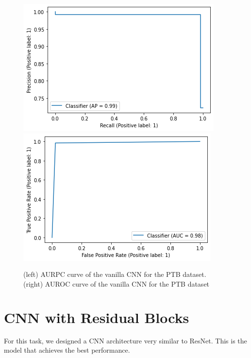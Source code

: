 \documentclass[11pt]{scrartcl}
\begin{document}
\begin{figure}[htp]
\centering
\includegraphics[width=.50\textwidth]{../models_performance_graphs/ptb/cnn_ptb_auprc.png}\hfill
\includegraphics[width=.50\textwidth]{../models_performance_graphs/ptb/cnn_ptb_auroc.png}\hfill
\caption{(left) AURPC curve of the vanilla CNN for the PTB dataset. \\ (right) AUROC curve of the vanilla CNN for the PTB dataset}
\label{fig:cnn_ptb_two}
\end{figure}



\section{CNN with Residual Blocks}
For this task, we designed a CNN architecture very similar to ResNet. This is the model that achieves the best performance.
\end{document}
